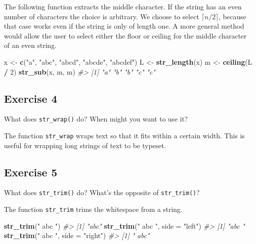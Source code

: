\documentclass[]{book}
\newenvironment{Shaded}{\begin{snugshade}}{\end{snugshade}}
\newcommand{\CommentTok}[1]{\textcolor[rgb]{0.56,0.35,0.01}{\textit{#1}}}
\newcommand{\DataTypeTok}[1]{\textcolor[rgb]{0.13,0.29,0.53}{#1}}
\newcommand{\DecValTok}[1]{\textcolor[rgb]{0.00,0.00,0.81}{#1}}
\newcommand{\KeywordTok}[1]{\textcolor[rgb]{0.13,0.29,0.53}{\textbf{#1}}}
\newcommand{\NormalTok}[1]{#1}
\newcommand{\OperatorTok}[1]{\textcolor[rgb]{0.81,0.36,0.00}{\textbf{#1}}}
\newcommand{\StringTok}[1]{\textcolor[rgb]{0.31,0.60,0.02}{#1}}
\theoremstyle{plain}
\theoremstyle{remark}
\theoremstyle{definition}
\theoremstyle{definition}
\theoremstyle{definition}
\theoremstyle{remark}
\begin{document}
The following function extracts the middle character. If the string has
an even number of characters the choice is arbitrary. We choose to
select \(\lceil n / 2 \rceil\), because that case works even if the
string is only of length one. A more general method would allow the user
to select either the floor or ceiling for the middle character of an
even string.

\begin{Shaded}
\begin{Highlighting}[]
\NormalTok{x <-}\StringTok{ }\KeywordTok{c}\NormalTok{(}\StringTok{"a"}\NormalTok{, }\StringTok{"abc"}\NormalTok{, }\StringTok{"abcd"}\NormalTok{, }\StringTok{"abcde"}\NormalTok{, }\StringTok{"abcdef"}\NormalTok{)}
\NormalTok{L <-}\StringTok{ }\KeywordTok{str_length}\NormalTok{(x)}
\NormalTok{m <-}\StringTok{ }\KeywordTok{ceiling}\NormalTok{(L }\OperatorTok{/}\StringTok{ }\DecValTok{2}\NormalTok{)}
\KeywordTok{str_sub}\NormalTok{(x, m, m)}
\CommentTok{#> [1] "a" "b" "b" "c" "c"}
\end{Highlighting}
\end{Shaded}

\hypertarget{exercise-4-20}{%
\subsection{Exercise 4}\label{exercise-4-20}}

What does \texttt{str\_wrap()} do? When might you want to use it?

The function \texttt{str\_wrap} wraps text so that it fits within a
certain width. This is useful for wrapping long strings of text to be
typeset.

\hypertarget{exercise-5-12}{%
\subsection{Exercise 5}\label{exercise-5-12}}

What does \texttt{str\_trim()} do? What's the opposite of
\texttt{str\_trim()}?

The function \texttt{str\_trim} trims the whitespace from a string.

\begin{Shaded}
\begin{Highlighting}[]
\KeywordTok{str_trim}\NormalTok{(}\StringTok{" abc "}\NormalTok{)}
\CommentTok{#> [1] "abc"}
\KeywordTok{str_trim}\NormalTok{(}\StringTok{" abc "}\NormalTok{, }\DataTypeTok{side =} \StringTok{"left"}\NormalTok{)}
\CommentTok{#> [1] "abc "}
\KeywordTok{str_trim}\NormalTok{(}\StringTok{" abc "}\NormalTok{, }\DataTypeTok{side =} \StringTok{"right"}\NormalTok{)}
\CommentTok{#> [1] " abc"}
\end{Highlighting}
\end{Shaded}
\end{document}
